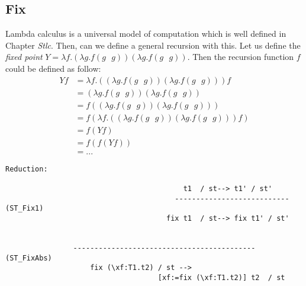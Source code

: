 \subsection{Fix}
Lambda calculus is a universal model of computation which is well defined in Chapter \textit{Stlc}. Then, can we define a general recursion with this. Let us define the \textit{fixed point} $Y = \lambda f. (\lambda g. f(g\text{ }g))(\lambda g. f(g\text{ }g))$. Then the recursion function $f$ could be defined as follow:
\begin{align*}
Yf &=  \lambda f. ((\lambda g. f(g\text{ }g))(\lambda g. f(g\text{ }g))) f \\
&=  (\lambda g. f(g\text{ }g))(\lambda g. f(g\text{ }g)) \\
&= f ((\lambda g. f(g\text{ }g))(\lambda g. f(g\text{ }g))) \\
&= f (\lambda f. ((\lambda g. f(g\text{ }g))(\lambda g. f(g\text{ }g))) f ) \\
&= f(Yf)\\
&= f(f(Yf))\\
&= ...
\end{align*}
\begin{lstlisting}
Reduction:

									      t1  / st--> t1' / st'
										---------------------------    (ST_Fix1)
									  fix t1  / st--> fix t1' / st'

				
				-------------------------------------------  (ST_FixAbs)
					fix (\xf:T1.t2) / st --> 
									[xf:=fix (\xf:T1.t2)] t2  / st
\end{lstlisting}

